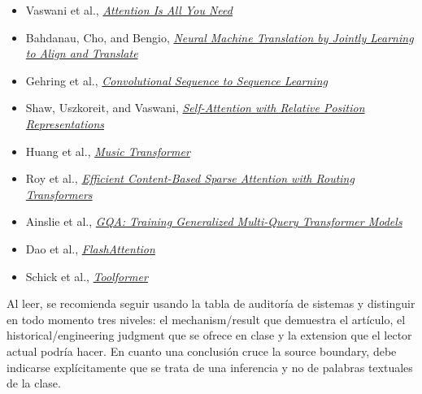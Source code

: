 \documentclass[a4paper]{article}
\begin{document}
\begingroup
\footnotesize
\begin{itemize}[itemsep=0pt,topsep=0.15em,parsep=0pt]
  \item Vaswani et al., \href{https://arxiv.org/abs/1706.03762}{\emph{Attention Is All You Need}}
  \item Bahdanau, Cho, and Bengio, \href{https://arxiv.org/abs/1409.0473}{\emph{Neural Machine Translation by Jointly Learning to Align and Translate}}
  \item Gehring et al., \href{https://arxiv.org/abs/1705.03122}{\emph{Convolutional Sequence to Sequence Learning}}
  \item Shaw, Uszkoreit, and Vaswani, \href{https://arxiv.org/abs/1803.02155}{\emph{Self-Attention with Relative Position Representations}}
  \item Huang et al., \href{https://arxiv.org/abs/1809.04281}{\emph{Music Transformer}}
  \item Roy et al., \href{https://arxiv.org/abs/2003.05997}{\emph{Efficient Content-Based Sparse Attention with Routing Transformers}}
  \item Ainslie et al., \href{https://arxiv.org/abs/2305.13245}{\emph{GQA: Training Generalized Multi-Query Transformer Models}}
  \item Dao et al., \href{https://arxiv.org/abs/2205.14135}{\emph{FlashAttention}}
  \item Schick et al., \href{https://arxiv.org/abs/2302.04761}{\emph{Toolformer}}
\end{itemize}

Al leer, se recomienda seguir usando la tabla de auditoría de sistemas y distinguir en todo momento tres niveles: el mechanism/result que demuestra el artículo, el historical/engineering judgment que se ofrece en clase y la extension que el lector actual podría hacer. En cuanto una conclusión cruce la source boundary, debe indicarse explícitamente que se trata de una inferencia y no de palabras textuales de la clase.
\endgroup
\end{document}
